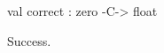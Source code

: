 \chklistingtrue
{}
\begin{ChkListingMsg}
val correct : zero -C-> float 
\end{ChkListingMsg}
\begin{ChkListingErr}
Success.
\end{ChkListingErr}
